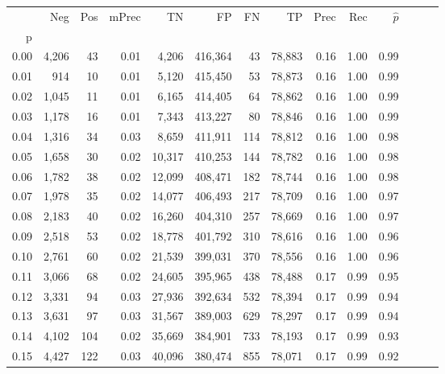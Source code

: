 \begin{tabular}{rrrrrrrrrrrrrr}
\toprule
{} &    Neg &    Pos & mPrec &       TN &       FP &      FN &      TP &  Prec &   Rec & $\hat{p}$ \\
p    &        &        &       &          &          &         &         &       &       &           \\
\midrule
0.00 &  4,206 &     43 &  0.01 &    4,206 &  416,364 &      43 &  78,883 &  0.16 &  1.00 &      0.99 \\
0.01 &    914 &     10 &  0.01 &    5,120 &  415,450 &      53 &  78,873 &  0.16 &  1.00 &      0.99 \\
0.02 &  1,045 &     11 &  0.01 &    6,165 &  414,405 &      64 &  78,862 &  0.16 &  1.00 &      0.99 \\
0.03 &  1,178 &     16 &  0.01 &    7,343 &  413,227 &      80 &  78,846 &  0.16 &  1.00 &      0.99 \\
0.04 &  1,316 &     34 &  0.03 &    8,659 &  411,911 &     114 &  78,812 &  0.16 &  1.00 &      0.98 \\
0.05 &  1,658 &     30 &  0.02 &   10,317 &  410,253 &     144 &  78,782 &  0.16 &  1.00 &      0.98 \\
0.06 &  1,782 &     38 &  0.02 &   12,099 &  408,471 &     182 &  78,744 &  0.16 &  1.00 &      0.98 \\
0.07 &  1,978 &     35 &  0.02 &   14,077 &  406,493 &     217 &  78,709 &  0.16 &  1.00 &      0.97 \\
0.08 &  2,183 &     40 &  0.02 &   16,260 &  404,310 &     257 &  78,669 &  0.16 &  1.00 &      0.97 \\
0.09 &  2,518 &     53 &  0.02 &   18,778 &  401,792 &     310 &  78,616 &  0.16 &  1.00 &      0.96 \\
0.10 &  2,761 &     60 &  0.02 &   21,539 &  399,031 &     370 &  78,556 &  0.16 &  1.00 &      0.96 \\
0.11 &  3,066 &     68 &  0.02 &   24,605 &  395,965 &     438 &  78,488 &  0.17 &  0.99 &      0.95 \\
0.12 &  3,331 &     94 &  0.03 &   27,936 &  392,634 &     532 &  78,394 &  0.17 &  0.99 &      0.94 \\
0.13 &  3,631 &     97 &  0.03 &   31,567 &  389,003 &     629 &  78,297 &  0.17 &  0.99 &      0.94 \\
0.14 &  4,102 &    104 &  0.02 &   35,669 &  384,901 &     733 &  78,193 &  0.17 &  0.99 &      0.93 \\
0.15 &  4,427 &    122 &  0.03 &   40,096 &  380,474 &     855 &  78,071 &  0.17 &  0.99 &      0.92 \\

\end{tabular}
